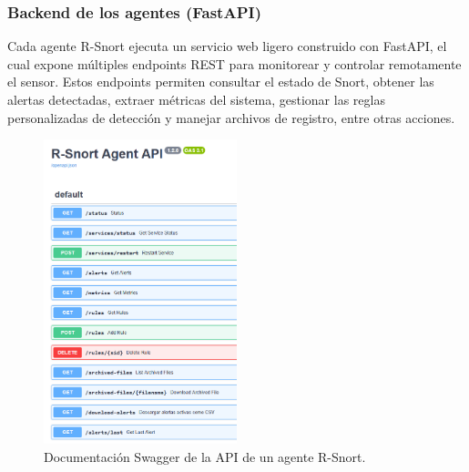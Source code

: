 \documentclass[11pt,a4paper,twoside]{report}
\begin{document}
\subsubsection{Backend de los agentes (FastAPI)}

Cada agente R-Snort ejecuta un servicio web ligero construido con FastAPI, el cual expone múltiples endpoints REST para monitorear y controlar remotamente el sensor. Estos endpoints permiten consultar el estado de Snort, obtener las alertas detectadas, extraer métricas del sistema, gestionar las reglas personalizadas de detección y manejar archivos de registro, entre otras acciones.


\begin{figure}[htb]
	\centering
	\includegraphics[width=0.5\textwidth]{documento/13.png}
	\caption{Documentación Swagger de la API de un agente R-Snort.}
	\label{fig:fastapi}
\end{figure}
\end{document}
